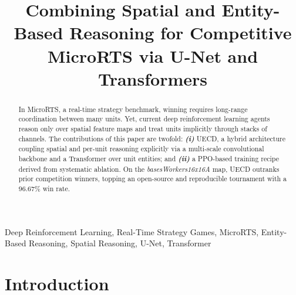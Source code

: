 \documentclass[conference]{IEEEtran}
\newcommand{\code}[1]{{\ttfamily\hyphenchar\font=45\relax #1}}
\begin{document}
\title{Combining Spatial and Entity-Based Reasoning for Competitive MicroRTS via U-Net and Transformers}

\author{%
  \and
  \and
}

\IEEEoverridecommandlockouts
{}

\maketitle

\IEEEpubidadjcol

\begin{abstract}
In MicroRTS, a real-time strategy benchmark, winning requires long-range coordination between many units. Yet, current deep reinforcement learning agents reason only over spatial feature maps and treat units implicitly through stacks of channels. The contributions of this paper are twofold: \textbf{\emph{(i)}} \code{UECD}, a hybrid architecture coupling spatial and per-unit reasoning explicitly via a multi-scale convolutional backbone and a Transformer over unit entities; and \textbf{\emph{(ii)}} a PPO-based training recipe derived from systematic ablation. On the \emph{basesWorkers16x16A} map, \code{UECD} outranks prior competition winners, topping an open-source and reproducible tournament with a $96.67$\% win rate.
\end{abstract}

\begin{IEEEkeywords}
Deep Reinforcement Learning, Real-Time Strategy Games, MicroRTS, Entity-Based Reasoning, Spatial Reasoning, U-Net, Transformer
\end{IEEEkeywords}

\section{Introduction}
\end{document}
